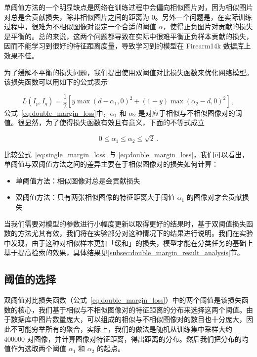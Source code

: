 单阈值方法的一个明显缺点是网络在训练过程中会偏向相似图片对，因为相似图片对总是会贡献损失，除非相似图片之间的距离为 0。另外一个问题是，在实际训练过程中，很难为不相似图像对设定一个合适的阈值 $\alpha$，使得正负图片对贡献的损失是平衡的。总的来说，这两个问题都导致在实际中很难平衡正负样本贡献的损失，因而不能学习到很好的特征距离度量，导致学习到的模型在 Firearm14k 数据库上效果不佳。

为了缓解不平衡的损失问题，我们提出使用双阈值对比损失函数来优化网络模型。该损失函数可以用如下的公式表示

\begin{equation}\label{eq:double_margin_loss}
L(I_p, I_q) = \frac{1}{2}[y\max(d - {\alpha}_1, 0)^2 + (1-y)\max({\alpha}_2 - d, 0)^2]\, ,
\end{equation}
公式~\ref{eq:double_margin_loss}中，$\alpha_1$ 和 $\alpha_2$ 是对应于相似与不相似图像对的阈值。很显然，为了使得损失函数有效且有意义，下面的不等式成立

\begin{equation}
0 \leq \alpha_1 \leq \alpha_2 \leq \sqrt{2}\, .
\end{equation}

比较公式~\ref{eq:single_margin_loss} 与 \ref{eq:double_margin_loss}，我们可以看出，单阈值与双阈值方法之间的差异主要在于相似图像对的损失如何计算：
\begin{itemize}
\item 单阈值方法：相似图像对总是会贡献损失
\item 双阈值方法：只有两张相似图像的特征距离大于阈值 $\alpha_1$ 的图像对才会贡献损失
\end{itemize}


当我们需要对模型的参数进行小幅度更新以取得更好的结果时，基于双阈值损失函数的方法尤其有效，我们将在实验部分对这种情况下的结果进行说明。我们在实验中发现，由于这种对相似样本更加「缓和」的损失，模型才能在分类任务的基础上基于提高检索的效果，具体结果见\ref{subsec:double_margin_result_analysis}节。

\subsection{阈值的选择}
双阈值对比损失函数（公式~\ref{eq:double_margin_loss}）中的两个阈值是该损失函数的核心，我们基于相似与不相似图像对的特征距离的分布来选择这两个阈值。由于数据库中图片数量庞大，可以组成的相似与不相似图像对的数目也十分庞大，因此不可能穷举所有的聚合，实际上，我们的做法是随机从训练集中采样大约 400000 对图像，并计算图像对特征距离，得出距离的分布。然后我们把分布的均值作为选取两个阈值 $\alpha_1$ 和 $\alpha_2$ 的起点。

